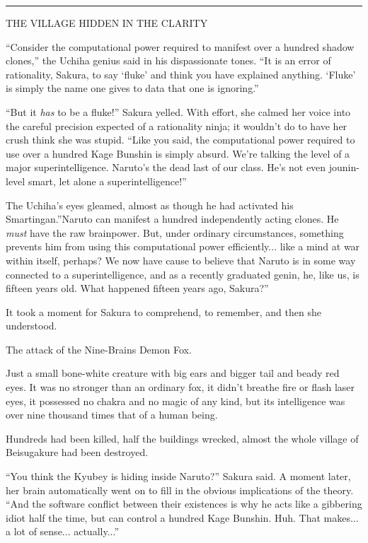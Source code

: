 \begin{center}\rule{3in}{0.4pt}\end{center}

THE VILLAGE HIDDEN IN THE CLARITY

``Consider the computational power required to manifest over a hundred
shadow clones,'' the Uchiha genius said in his dispassionate tones. ``It
is an error of rationality, Sakura, to say `fluke' and think you have
explained anything. `Fluke' is simply the name one gives to data that
one is ignoring.''

``But it \emph{has} to be a fluke!'' Sakura yelled. With effort, she
calmed her voice into the careful precision expected of a rationality
ninja; it wouldn't do to have her crush think she was stupid. ``Like you
said, the computational power required to use over a hundred Kage
Bunshin is simply absurd. We're talking the level of a major
superintelligence. Naruto's the dead last of our class. He's not even
jounin-level smart, let alone a superintelligence!''

The Uchiha's eyes gleamed, almost as though he had activated his
Smartingan.''Naruto can manifest a hundred independently acting clones.
He \emph{must} have the raw brainpower. But, under ordinary
circumstances, something prevents him from using this computational
power efficiently... like a mind at war within itself, perhaps? We
now have cause to believe that Naruto is in some way connected to a
superintelligence, and as a recently graduated genin, he, like us, is
fifteen years old. What happened fifteen years ago, Sakura?''

It took a moment for Sakura to comprehend, to remember, and then she
understood.

The attack of the Nine-Brains Demon Fox.

Just a small bone-white creature with big ears and bigger tail and beady
red eyes. It was no stronger than an ordinary fox, it didn't breathe
fire or flash laser eyes, it possessed no chakra and no magic of any
kind, but its intelligence was over nine thousand times that of a human
being.

Hundreds had been killed, half the buildings wrecked, almost the whole
village of Beisugakure had been destroyed.

``You think the Kyubey is hiding inside Naruto?'' Sakura said. A moment
later, her brain automatically went on to fill in the obvious
implications of the theory. ``And the software conflict between their
existences is why he acts like a gibbering idiot half the time, but can
control a hundred Kage Bunshin. Huh. That makes... a lot of
sense... actually...''


